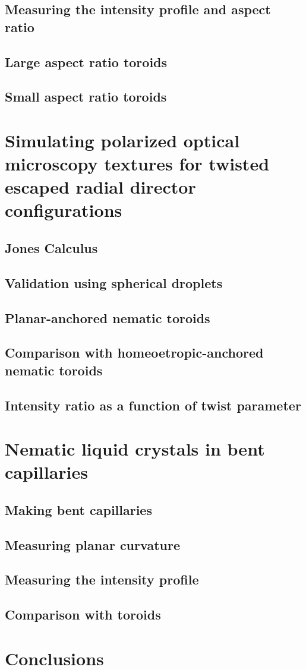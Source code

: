 \subsection{Measuring the intensity profile and aspect ratio}
\subsection{Large aspect ratio toroids}
\subsection{Small aspect ratio toroids}

\section{Simulating polarized optical microscopy textures for twisted escaped radial director configurations}
\subsection{Jones Calculus}
\subsection{Validation using spherical droplets}
\subsection{Planar-anchored nematic toroids}
\subsection{Comparison with homeoetropic-anchored nematic toroids}
\subsection{Intensity ratio as a function of twist parameter}

\section{Nematic liquid crystals in bent capillaries}
\subsection{Making bent capillaries}
\subsection{Measuring planar curvature}
\subsection{Measuring the intensity profile}
\subsection{Comparison with toroids}

\section{Conclusions}
